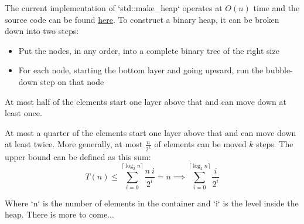 \documentclass{article}
\begin{document}
\begin{flushleft}

The current implementation of `std::make_heap` operates at $O(n)$ time and the source code can be found \href{https://gcc.gnu.org/onlinedocs/gcc-4.6.2/libstdc++/api/a01051_source.html#l00375}{\underline{here}}.
To construct a binary heap, it can be broken down into two steps:
\begin{itemize}
\item Put the nodes, in any order, into a complete binary tree of the right size  
\item For each node, starting the bottom layer and going upward, run the bubble-down step on that node
\end{itemize}

At most half of the elements start one layer above that and can move down at least once.

At most a quarter of the elements start one layer above that and can move down at least twice.
More generally, at most $\frac{n}{2^{k}}$ of elements can be moved $k$ steps.
The upper bound can be defined as this sum:
\[ 
		T(n) \le \sum_{i=0}^{\lceil \log_{2}n \rceil}\frac{n\:i}{2^{i}} = n
		\implies \sum_{i=0}^{\lceil \log_{2}n \rceil}\frac{i}{2^{i}}
\]

Where `n` is the number of elements in the container and `i` is the level inside the heap.
There is more to come...



\end{flushleft}
\end{document}

